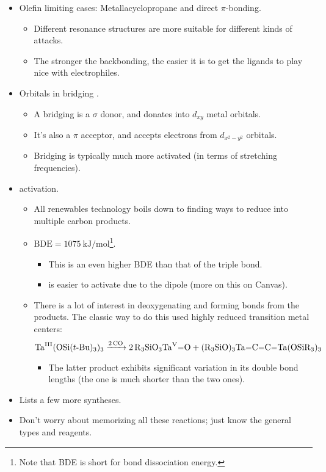\documentclass[../notes.tex]{subfiles}
\begin{document}
\begin{itemize}
    \item Olefin limiting cases: Metallacyclopropane and direct $\pi$-bonding.
    \begin{itemize}
        \item Different resonance structures are more suitable for different kinds of attacks.
        \item The stronger the backbonding, the easier it is to get the ligands to play nice with electrophiles.
    \end{itemize}
    \item Orbitals in bridging .
    \begin{itemize}
        \item A bridging  is a $\sigma$ donor, and donates into $d_{xy}$ metal orbitals.
        \item It's also a $\pi$ acceptor, and accepts electrons from $d_{x^2-y^2}$ orbitals.
        \item Bridging is typically much more activated (in terms of  stretching frequencies).
    \end{itemize}
    \item {} activation.
    \begin{itemize}
        \item All renewables technology boils down to finding ways to reduce  into multiple carbon products.
        \item {} $\text{BDE}=\SI[per-mode=symbol]{1075}{\kilo\joule\per\mole}$\footnote{Note that BDE is short for bond dissociation energy.}.
        \begin{itemize}
            \item This is an even higher BDE than that of the  triple bond.
            \item {} is easier to activate due to the dipole (more on this on Canvas).
        \end{itemize}
        \item There is a lot of interest in deoxygenating  and forming  bonds from the products. The classic way to do this used highly reduced transition metal centers:
        \begin{equation*}
            \ce{Ta^{III}(OSi({$t$-}Bu)3)3 ->[2CO] 2R3SiO3Ta^V=O + (R3SiO)3Ta=C=C=Ta(OSiR3)3}
        \end{equation*}
        \begin{itemize}
            \item The latter product exhibits significant variation in its double bond lengths (the  one is much shorter than the two  ones).
        \end{itemize}
    \end{itemize}
    \item Lists a few more syntheses.
    \item Don't worry about memorizing all these reactions; just know the general types and reagents.
\end{itemize}
\end{document}
